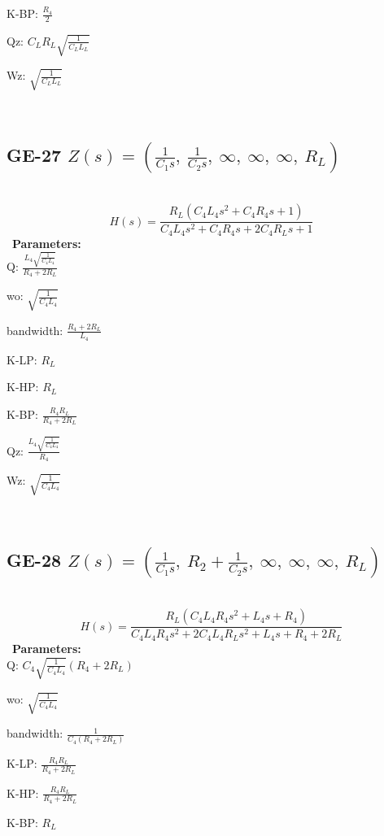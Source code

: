 \documentclass{article}
\begin{document}
K-BP: $\frac{R_{4}}{2}$\ 

Qz: $C_{L} R_{L} \sqrt{\frac{1}{C_{L} L_{L}}}$\ 

Wz: $\sqrt{\frac{1}{C_{L} L_{L}}}$\ 

\ 

\subsection{GE-27 $Z(s) = \left( \frac{1}{C_{1} s}, \  \frac{1}{C_{2} s}, \  \infty, \  \infty, \  \infty, \  R_{L}\right)$ } \ 
\textbf{\[H(s) = \frac{R_{L} \left(C_{4} L_{4} s^{2} + C_{4} R_{4} s + 1\right)}{C_{4} L_{4} s^{2} + C_{4} R_{4} s + 2 C_{4} R_{L} s + 1}\] } \ 
\textbf{Parameters:}\\ 

Q: $\frac{L_{4} \sqrt{\frac{1}{C_{4} L_{4}}}}{R_{4} + 2 R_{L}}$\ 

wo: $\sqrt{\frac{1}{C_{4} L_{4}}}$\ 

bandwidth: $\frac{R_{4} + 2 R_{L}}{L_{4}}$\ 

K-LP: $R_{L}$\ 

K-HP: $R_{L}$\ 

K-BP: $\frac{R_{4} R_{L}}{R_{4} + 2 R_{L}}$\ 

Qz: $\frac{L_{4} \sqrt{\frac{1}{C_{4} L_{4}}}}{R_{4}}$\ 

Wz: $\sqrt{\frac{1}{C_{4} L_{4}}}$\ 

\ 

\subsection{GE-28 $Z(s) = \left( \frac{1}{C_{1} s}, \  R_{2} + \frac{1}{C_{2} s}, \  \infty, \  \infty, \  \infty, \  R_{L}\right)$ } \ 
\textbf{\[H(s) = \frac{R_{L} \left(C_{4} L_{4} R_{4} s^{2} + L_{4} s + R_{4}\right)}{C_{4} L_{4} R_{4} s^{2} + 2 C_{4} L_{4} R_{L} s^{2} + L_{4} s + R_{4} + 2 R_{L}}\] } \ 
\textbf{Parameters:}\\ 

Q: $C_{4} \sqrt{\frac{1}{C_{4} L_{4}}} \left(R_{4} + 2 R_{L}\right)$\ 

wo: $\sqrt{\frac{1}{C_{4} L_{4}}}$\ 

bandwidth: $\frac{1}{C_{4} \left(R_{4} + 2 R_{L}\right)}$\ 

K-LP: $\frac{R_{4} R_{L}}{R_{4} + 2 R_{L}}$\ 

K-HP: $\frac{R_{4} R_{L}}{R_{4} + 2 R_{L}}$\ 

K-BP: $R_{L}$\ 
\end{document}
